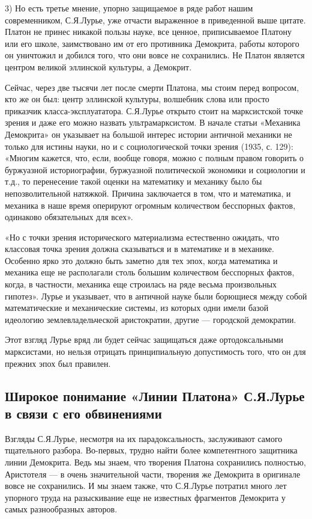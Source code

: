 3) Но есть третье мнение, упорно защищаемое в ряде работ нашим
современником, С.Я.Лурье, уже отчасти выраженное в приведенной выше
цитате. Платон не принес никакой пользы науке, все ценное,
приписываемое Платону или его школе, заимствовано им от его противника
Демокрита, работы которого он уничтожил и добился того, что они вовсе
не сохранились. Не Платон является центром великой эллинской культуры,
а Демокрит.

Сейчас, через две тысячи лет после смерти Платона, мы стоим перед
вопросом, кто же он был: центр эллинской культуры, волшебник слова или
просто приказчик класса-эксплуататора. С.Я.Лурье открыто стоит на
марксистской точке зрения и даже его можно назвать ультрамарксистом. В
начале статьи «Механика Демокрита» он указывает на большой интерес
истории античной механики не только для истины науки, но и с
социологической точки зрения (1935, с. 129): «Многим кажется, что,
если, вообще говоря, можно с полным правом говорить о буржуазной
историографии, буржуазной политической экономики и социологии и т.д.,
то перенесение такой оценки на математику и механику было бы
непозволительной натяжкой. Причина заключается в том, что и
математика, и механика в наше время оперируют огромным количеством
бесспорных фактов, одинаково обязательных для всех».

«Но с точки зрения исторического материализма естественно ожидать, что
классовая точка зрения должна сказываться и в математике и в механике.
Особенно ярко это должно быть заметно для тех эпох, когда математика и
механика еще не располагали столь большим количеством бесспорных
фактов, когда, в частности, механика еще строилась на ряде весьма
произвольных гипотез». Лурье и указывает, что в античной науке были
борющиеся между собой математические и механические системы, из
которых одни имели базой идеологию землевладельческой аристократии,
другие --- городской демократии.

Этот взгляд Лурье вряд ли будет сейчас защищаться даже ортодоксальными
марксистами, но нельзя отрицать принципиальную допустимость того, что
он для прежних эпох был правилен.

\subsection{Широкое понимание «Линии Платона» С.Я.Лурье в связи с
его обвинениями}

Взгляды С.Я.Лурье, несмотря на их парадоксальность, заслуживают самого
тщательного разбора. Во-первых, трудно найти более компетентного
защитника линии Демокрита. Ведь мы знаем, что творения Платона
сохранились полностью, Аристотеля --- в очень значительной части,
творения же Демокрита в оригинале вовсе не сохранились. И мы знаем
также, что С.Я.Лурье потратил много лет упорного труда на разыскивание
еще не известных фрагментов Демокрита у самых разнообразных авторов.

